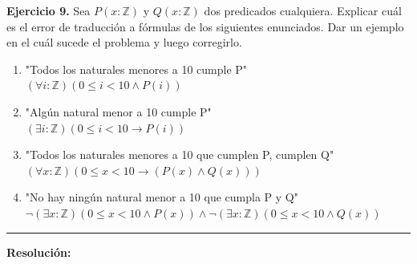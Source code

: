 \hypertarget{ej9}{}
\noindent \textbf{Ejercicio 9.} Sea $P(x:\mathbb{Z})$ y $Q(x:\mathbb{Z})$ dos predicados cualquiera. Explicar cuál es el error de traducción a fórmulas de los siguientes enunciados. Dar un ejemplo en el cuál sucede el problema y luego corregirlo.

\begin{enumerate}[label=\alph*)]
    \item "Todos los naturales menores a 10 cumple P" \\
    $(\forall i:\mathbb{Z})(0 \leq i < 10 \wedge P(i))$
    \item "Algún natural menor a 10 cumple P" \\
    $(\exists i:\mathbb{Z})(0 \leq i < 10 \rightarrow P(i))$
    \item "Todos los naturales menores a 10 que cumplen P, cumplen Q" \\
    $(\forall x:\mathbb{Z})(0 \leq x < 10 \rightarrow (P(x) \wedge Q(x)))$
    \item "No hay ningún natural menor a 10 que cumpla P y Q" \\
    $\neg (\exists x:\mathbb{Z})(0 \leq x < 10 \wedge P(x)) \wedge \neg (\exists x:\mathbb{Z})(0 \leq x < 10 \wedge Q(x))$
\end{enumerate}

\vspace{0.2cm}
{\color{gray}\hrule}
\vspace{0.4cm}

\textbf{Resolución:}

